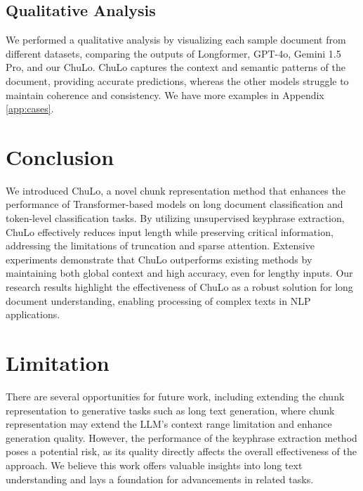 \documentclass[11pt]{article}
\begin{document}
\subsection{Qualitative Analysis}
We performed a qualitative analysis by visualizing each sample document from different datasets, comparing the outputs of Longformer, GPT-4o, Gemini 1.5 Pro, and our ChuLo. ChuLo captures the context and semantic patterns of the document, providing accurate predictions, whereas the other models struggle to maintain coherence and consistency. We have more examples in Appendix \ref{app:cases}.















\section{Conclusion}
We introduced ChuLo, a novel chunk representation method that enhances the performance of Transformer-based models on long document classification and token-level classification tasks. By utilizing unsupervised keyphrase extraction, ChuLo effectively reduces input length while preserving critical information, addressing the limitations of truncation and sparse attention. Extensive experiments demonstrate that ChuLo outperforms existing methods by maintaining both global context and high accuracy, even for lengthy inputs. Our research results highlight the effectiveness of ChuLo as a robust solution for long document understanding, enabling processing of complex texts in NLP applications.

\section{Limitation}
There are several opportunities for future work, including extending the chunk representation to generative tasks such as long text generation, where chunk representation may extend the LLM's context range limitation and enhance generation quality. However, the performance of the keyphrase extraction method poses a potential risk, as its quality directly affects the overall effectiveness of the approach. We believe this work offers valuable insights into long text understanding and lays a foundation for advancements in related tasks.
\end{document}
